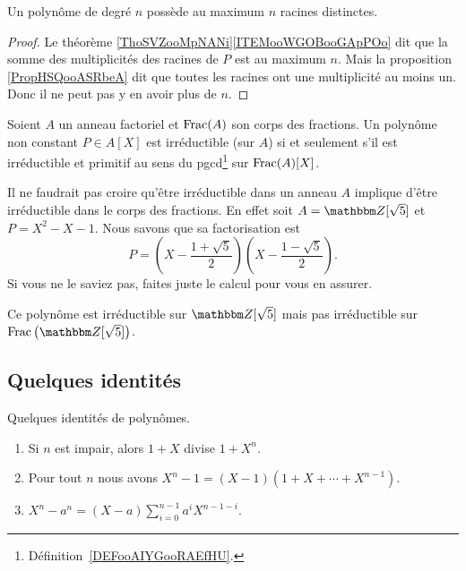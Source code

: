 \begin{corollary}       \label{CORooUGJGooBofWLr}
    Un polynôme de degré \( n\) possède au maximum \( n\) racines distinctes.
\end{corollary}

\begin{proof}
    Le théorème \ref{ThoSVZooMpNANi}\ref{ITEMooWGOBooGApPOo} dit que la somme des multiplicités des racines de \( P\) est au maximum \( n\). Mais la proposition \ref{PropHSQooASRbeA} dit que toutes les racines ont une multiplicité au moins un. Donc il ne peut pas y en avoir plus de \( n\).
\end{proof}

\begin{corollary}       \label{CORooZCSOooHQVAOV}
    Soient \( A\) un anneau factoriel et \( \operatorname{Frac}(A)\) son corps des fractions. Un polynôme non constant \( P\in A[X]\) est irréductible (sur \( A\)) si et seulement s'il est irréductible et primitif au sens du pgcd\footnote{Définition~\ref{DEFooAIYGooRAEfHU}.} sur \( \operatorname{Frac}(A)[X]\).
\end{corollary}

\begin{example}
    Il ne faudrait pas croire qu'être irréductible dans un anneau \( A\) implique d'être irréductible dans le corps des fractions. En effet soit \( A=\eZ[\sqrt{ 5 }]\) et \( P=X^2-X-1\). Nous savons que sa factorisation est 
    \begin{equation}
        P=\left( X-\frac{ 1+\sqrt{ 5 } }{ 2 } \right)\left( X-\frac{ 1-\sqrt{ 5 } }{ 2 } \right).
    \end{equation}
    Si vous ne le saviez pas, faites juste le calcul pour vous en assurer.

    Ce polynôme est irréductible sur \( \eZ[\sqrt{ 5 }]\) mais pas irréductible sur \( \Frac\big( \eZ[\sqrt{ 5 }] \big)\).
\end{example}

\subsection{Quelques identités}

\begin{lemma}   \label{LemISPooHIKJBU}
    Quelques identités de polynômes.
    \begin{enumerate}
        \item   \label{ItemLTBooAcyMtN}
            Si \( n\) est impair, alors \( 1+X\) divise \( 1+X^n\).
        \item\label{ItemLTBooAcyMtNii}
            Pour tout \( n\) nous avons \( X^n-1=(X-1)(1+X+\cdots +X^{n-1})\).
        \item \label{ItemLTBooAcyMtNiii}
            \( X^n-a^n=(X-a)\sum_{i=0}^{n-1}a^iX^{n-1-i}\).
    \end{enumerate}
\end{lemma}

